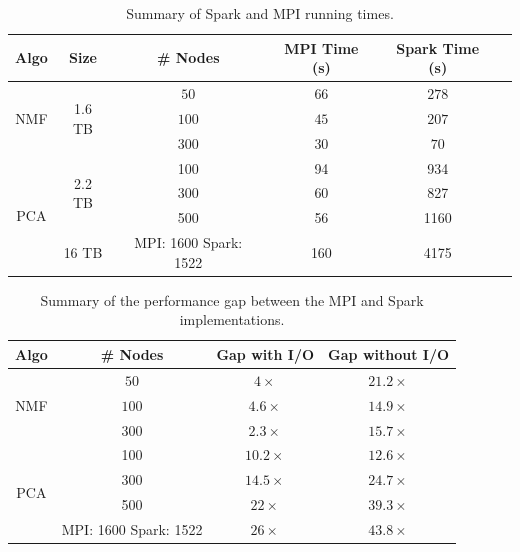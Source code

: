 \begin{table}[tbh]
\centering

\begin{tabular}{|c|c|c|c|c|c|} \hline
Algo & Size & \# Nodes & MPI Time (s) & Spark Time (s)\\ \hline
\multirow{3}{*}{NMF} & \multirow{3}{*}{1.6 TB} & $50$ & $66$ & $278$\\
{} & {} & $100$  & $45$ & $207$\\
{} & {} & $300$ & $30$ & $70$\\ \hline
\multirow{4}{*}{PCA} & \multirow{3}{*}{2.2 TB} & 100 & 94 & 934\\
 {} & {} & 300 & 60 & 827\\
 {} & {} & 500 & 56 & 1160\\ \cline{2-5}
 {} & {16 TB} & {MPI: 1600 Spark: 1522} & 160 & 4175 \\ \hline
\end{tabular}
\caption{{Summary of Spark and MPI running times.}}
\label{tab:matrix}
\end{table}

\begin{table}[tbh]
\begin{center}
\begin{tabular}{|c|c|c|c|} \hline
Algo & \# Nodes & Gap with I/O & Gap without I/O\\ \hline
\multirow{3}{*}{NMF} & $50$ & $4\times$ & $21.2 \times$\\
{} & $100$  & $4.6\times$ & $14.9\times$\\
{} & $300$ & $2.3\times$ & $15.7\times$\\ \hline
\multirow{4}{*}{PCA} & 100 & $10.2\times$ & $12.6\times$\\
 {} & 300 & $14.5\times$ & $24.7\times$\\
 {} & 500 & $22\times$ & $39.3\times$\\ \cline{2-4}
 {} & {MPI: 1600 Spark: 1522} & $26\times$ & $43.8\times$\\ \hline
\end{tabular}
\end{center}
\caption{Summary of the performance gap between the MPI and Spark implementations.}
\label{tab:perfgaps}
\end{table}

